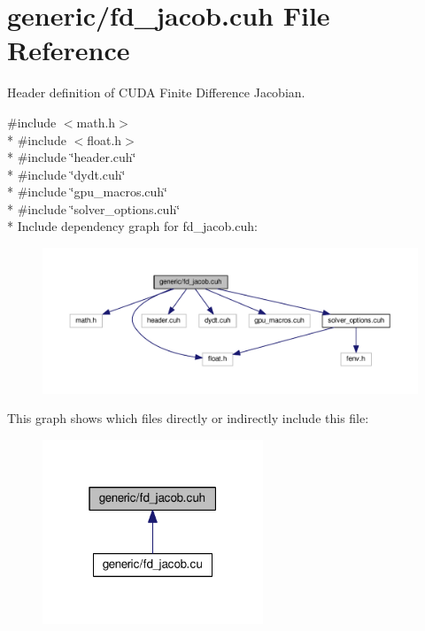 \hypertarget{fd__jacob_8cuh}{}\section{generic/fd\+\_\+jacob.cuh File Reference}
\label{fd__jacob_8cuh}


Header definition of C\+U\+DA Finite Difference Jacobian.  


{\ttfamily \#include $<$math.\+h$>$}\\*
{\ttfamily \#include $<$float.\+h$>$}\\*
{\ttfamily \#include \char`\"{}header.\+cuh\char`\"{}}\\*
{\ttfamily \#include \char`\"{}dydt.\+cuh\char`\"{}}\\*
{\ttfamily \#include \char`\"{}gpu\+\_\+macros.\+cuh\char`\"{}}\\*
{\ttfamily \#include \char`\"{}solver\+\_\+options.\+cuh\char`\"{}}\\*
Include dependency graph for fd\+\_\+jacob.\+cuh\+:\nopagebreak
\begin{figure}[H]
\begin{center}
\leavevmode
\includegraphics[width=350pt]{fd__jacob_8cuh__incl}
\end{center}
\end{figure}
This graph shows which files directly or indirectly include this file\+:\nopagebreak
\begin{figure}[H]
\begin{center}
\leavevmode
\includegraphics[width=187pt]{fd__jacob_8cuh__dep__incl}
\end{center}
\end{figure}
